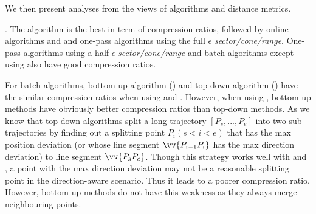 


We then present analyses from the views of \lsa algorithms and distance metrics.


. The \opt algorithm is the best in term of compression ratios, followed by online algorithms \opwa and \bqsa and one-pass algorithms using the full $\epsilon$ \emph{sector/cone/range}. One-pass algorithms using a half $\epsilon$ \emph{sector/cone/range} and batch algorithms except \dpa using \dad also have good compression ratios.

For batch algorithms, bottom-up algorithm (\tpa) and top-down algorithm (\dpa) have the similar compression ratios when using \ped and \sed. However, when using \dad, bottom-up methods have obviously better compression ratios than top-down methods.  As we know that top-down algorithms split a long trajectory $[P_s, ..., P_e]$ into two sub trajectories by finding out a splitting point $P_i (s<i<e)$ that has the max position deviation (or whose line segment $\vv{P_{i-1}P_{i}}$ has the max direction deviation) to line segment $\vv{P_sP_{e}}$. Though this strategy works well with \ped and \sed, a point with the max direction deviation may not be a reasonable splitting point in the direction-aware scenario. Thus it leads to a poorer compression ratio. However, bottom-up methods do not have this weakness as they always merge neighbouring points.

